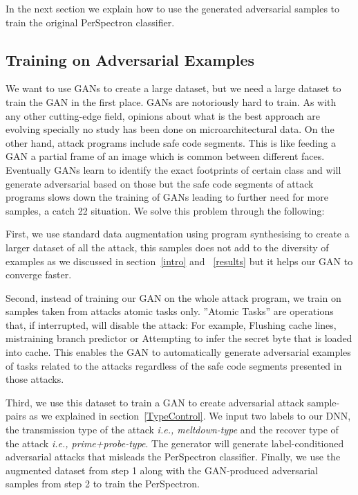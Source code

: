 In the next section we explain how to use the generated adversarial samples to train the original PerSpectron classifier. 

\subsection{Training on Adversarial Examples}

We want to use GANs to create a large dataset, but we need a large dataset to train the GAN in the first place. GANs are notoriously hard to  train. As with any other cutting-edge field, opinions about what is the best approach are evolving specially no study has been done on microarchitectural data.
On the other hand, attack programs include safe code segments. This is like feeding a GAN a partial frame of an image which is common between different faces. Eventually GANs learn to identify the exact footprints of certain class and will generate adversarial based on those but the safe code segments of attack programs slows down the training of GANs leading to further need for more samples, a catch 22 situation. We solve this problem through the following:


First, we use standard data augmentation using program synthesising to create a larger dataset of all the attack, this samples does not add to the diversity of examples as we discussed in section~\ref{intro} and ~\ref{results} but it helps our GAN to converge faster. 

Second, instead of training our GAN on the whole attack program, we train on samples taken from attacks atomic tasks only.  ”Atomic
Tasks” are operations that, if interrupted, will disable the attack: For example, Flushing cache lines, mistraining branch predictor  or
Attempting to infer the secret byte that is loaded into cache.
This enables the GAN to automatically generate adversarial examples of tasks related to the attacks regardless of the safe code segments presented in those attacks.

Third, we use this dataset to train a GAN to create adversarial attack sample-pairs as we explained in section~\ref{TypeControl}. We input two labels to our DNN, the transmission type of the attack {\em i.e., meltdown-type } and the recover type of the attack {\em i.e., prime+probe-type}. The generator will generate label-conditioned adversarial attacks that misleads the PerSpectron classifier. 
Finally, we use the augmented dataset from step 1 along with the GAN-produced adversarial samples from step 2 to train the PerSpectron. 

